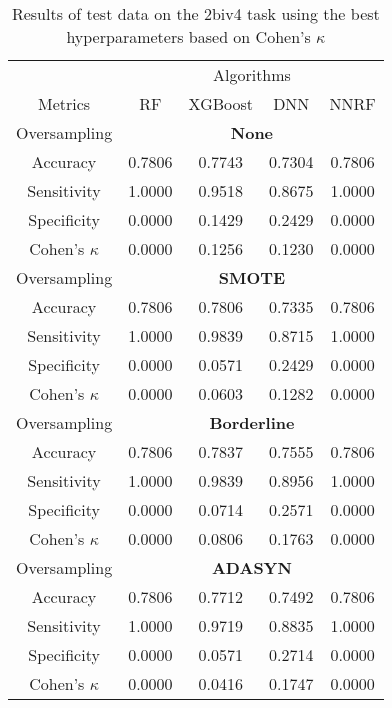 \begin{table}[!htb]
\centering
\caption{Results of test data on the 2biv4 task using the best hyperparameters based on Cohen's $\kappa$}
\label{tab:2biv4_test_results}
\begin{tabular}{c | c c c c}
\hline
 & \multicolumn{4}{c}{Algorithms}\\ 
Metrics &RF & XGBoost & DNN & NNRF\\ 
\hline
Oversampling &\multicolumn{4}{|c}{\textbf{None}}\\ 
\hline
Accuracy & 0.7806 & 0.7743 & 0.7304 & 0.7806\\ 
Sensitivity & 1.0000 & 0.9518 & 0.8675 & 1.0000\\ 
Specificity & 0.0000 & 0.1429 & 0.2429 & 0.0000\\ 
Cohen's $\kappa$ & 0.0000 & 0.1256 & 0.1230 & 0.0000\\ 
\hline
Oversampling &\multicolumn{4}{|c}{\textbf{SMOTE}}\\ 
\hline
Accuracy & 0.7806 & 0.7806 & 0.7335 & 0.7806\\ 
Sensitivity & 1.0000 & 0.9839 & 0.8715 & 1.0000\\ 
Specificity & 0.0000 & 0.0571 & 0.2429 & 0.0000\\ 
Cohen's $\kappa$ & 0.0000 & 0.0603 & 0.1282 & 0.0000\\ 
\hline
Oversampling &\multicolumn{4}{|c}{\textbf{Borderline}}\\ 
\hline
Accuracy & 0.7806 & 0.7837 & 0.7555 & 0.7806\\ 
Sensitivity & 1.0000 & 0.9839 & 0.8956 & 1.0000\\ 
Specificity & 0.0000 & 0.0714 & 0.2571 & 0.0000\\ 
Cohen's $\kappa$ & 0.0000 & 0.0806 & 0.1763 & 0.0000\\ 
\hline
Oversampling &\multicolumn{4}{|c}{\textbf{ADASYN}}\\ 
\hline
Accuracy & 0.7806 & 0.7712 & 0.7492 & 0.7806\\ 
Sensitivity & 1.0000 & 0.9719 & 0.8835 & 1.0000\\ 
Specificity & 0.0000 & 0.0571 & 0.2714 & 0.0000\\ 
Cohen's $\kappa$ & 0.0000 & 0.0416 & 0.1747 & 0.0000\\ 
\hline
\end{tabular}
\end{table}

